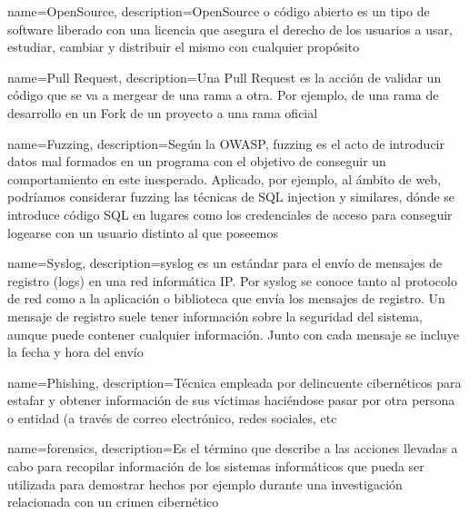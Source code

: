 



{
    name=OpenSource,
    description={OpenSource o código abierto es un tipo de software liberado con una licencia que asegura el derecho de los usuarios a usar, estudiar, cambiar y distribuir el mismo con cualquier propósito}
}

{
    name=Pull Request,
    description={Una Pull Request es la acción de validar un código que se va a mergear de una rama a otra. Por ejemplo, de una rama de desarrollo en un Fork de un proyecto a una rama oficial}
}

{
    name=Fuzzing,
    description={Según la OWASP, fuzzing es el acto de introducir datos mal formados en un programa con el objetivo de conseguir un comportamiento en este inesperado. Aplicado, por ejemplo, al ámbito de web, podríamos considerar fuzzing las técnicas de SQL injection y similares, dónde se introduce código SQL en lugares como los credenciales de acceso para conseguir logearse con un usuario distinto al que poseemos}
}

{
    name=Syslog,
    description={syslog es un estándar para el envío de mensajes de registro (logs) en una red informática IP. Por syslog se conoce tanto al protocolo de red como a la aplicación o biblioteca que envía los mensajes de registro. Un mensaje de registro suele tener información sobre la seguridad del sistema, aunque puede contener cualquier información. Junto con cada mensaje se incluye la fecha y hora del envío}
}

{
    name=Phishing,
    description={Técnica empleada por delincuente cibernéticos para estafar y obtener información de sus víctimas haciéndose pasar por otra persona o entidad (a través de correo electrónico, redes sociales, etc}
}



{
    name=forensics,
    description={Es el término que describe a las acciones llevadas a cabo para recopilar información de los sistemas informáticos que pueda ser utilizada para demostrar hechos por ejemplo durante una investigación relacionada con un crimen cibernético}
}

